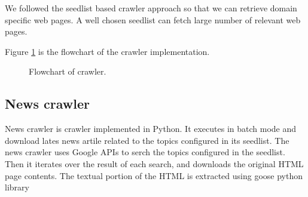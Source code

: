     We followed the seedlist based crawler approach so that we can retrieve
    domain specific web pages. A well chosen seedlist can fetch large number
    of relevant web pages.

 Figure \ref{fig:crawleralgo} is the flowchart of the crawler implementation.
\begin{figure}[htbp]
\centering
{}
\caption{Flowchart of crawler.}
\label{fig:crawleralgo}
\end{figure}

\subsection{News crawler} \label{newscrawlersection}
News crawler is crawler implemented in Python. It executes in
 batch mode and download lates news artile related to the topics configured
 in its seedlist. The news crawler uses Google APIs
 \cite{www-google-custom-search} to serch the topics configured in the
 seedlist. Then it iterates over the result of each search, and downloads the
  original HTML page contents. The textual portion of the HTML is extracted
  using goose python library \cite{www-goose}


